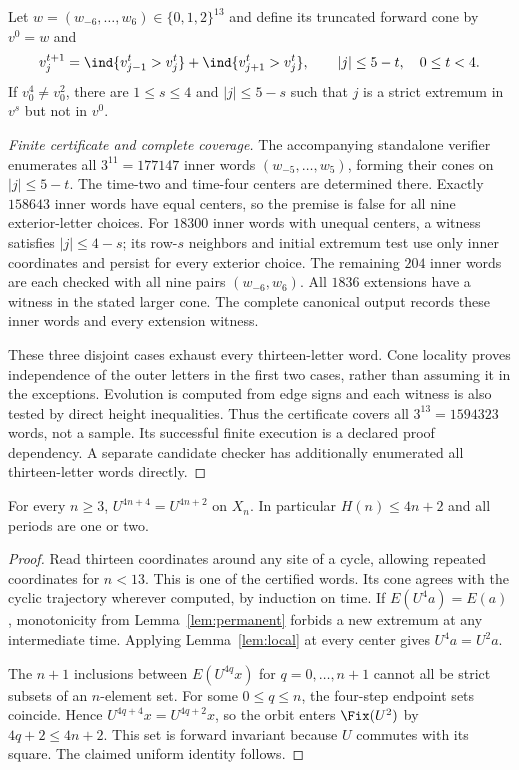 \begin{lemma}\label{lem:local}
 Let $w=(w_{-6},\ldots,w_6)\in\{0,1,2\}^{13}$ and define its truncated
 forward cone by $v^0=w$ and
 \[
 v^{t+1}_j=\ind{v^t_{j-1}>v^t_j}+\ind{v^t_{j+1}>v^t_j},
 \qquad |j|\le5-t,\quad 0\le t<4.
 \]
 If $v^4_0\ne v^2_0$, there are $1\le s\le4$ and $|j|\le5-s$ such
 that $j$ is a strict extremum in $v^s$ but not in $v^0$.
\end{lemma}
\begin{proof}[Finite certificate and complete coverage]
 The accompanying standalone verifier enumerates all $3^{11}=177147$
 inner words $(w_{-5},\ldots,w_5)$, forming their cones on
 $|j|\le5-t$. The time-two and time-four centers are determined there.
 Exactly $158643$ inner words have equal centers, so the premise is
 false for all nine exterior-letter choices. For $18300$ inner words
 with unequal centers, a witness satisfies $|j|\le4-s$; its row-$s$
 neighbors and initial extremum test use only inner coordinates and
 persist for every exterior choice. The remaining $204$ inner words
 are each checked with all nine pairs $(w_{-6},w_6)$. All $1836$
 extensions have a witness in the stated larger cone. The complete
 canonical output records these inner words and every extension witness.

 These three disjoint cases exhaust every thirteen-letter word. Cone
 locality proves independence of the outer letters in the first two
 cases, rather than assuming it in the exceptions. Evolution is
 computed from edge signs and each witness is also tested by direct
 height inequalities. Thus the certificate covers all $3^{13}=1594323$
 words, not a sample. Its successful finite execution is a declared
 proof dependency. A separate candidate checker has additionally
 enumerated all thirteen-letter words directly.
\end{proof}

\begin{theorem}\label{thm:clock}
 For every $n\ge3$, $U^{4n+4}=U^{4n+2}$ on $X_n$. In particular
 $H(n)\le4n+2$ and all periods are one or two.
\end{theorem}
\begin{proof}
 Read thirteen coordinates around any site of a cycle, allowing repeated
 coordinates for $n<13$. This is one of the certified words. Its cone
 agrees with the cyclic trajectory wherever computed, by induction on
 time. If $E(U^4a)=E(a)$, monotonicity from Lemma~\ref{lem:permanent}
 forbids a new extremum at any intermediate time. Applying
 Lemma~\ref{lem:local} at every center gives $U^4a=U^2a$.

 The $n+1$ inclusions between $E(U^{4q}x)$ for $q=0,\ldots,n+1$
 cannot all be strict subsets of an $n$-element set. For some
 $0\le q\le n$, the four-step endpoint sets coincide. Hence
 $U^{4q+4}x=U^{4q+2}x$, so the orbit enters $\Fix(U^2)$ by
 $4q+2\le4n+2$. This set is forward invariant because $U$ commutes
 with its square. The claimed uniform identity follows.
\end{proof}

